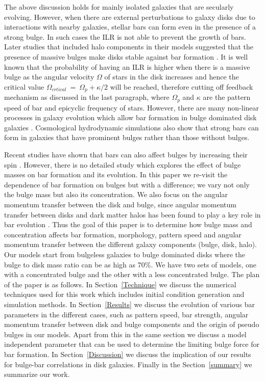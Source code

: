 \documentclass[a4paper,fleqn,usenatbib,useAMS]{mnras}
\begin{document}
The above discussion holds for mainly isolated galaxies that are secularly evolving. However, when there are external perturbations to galaxy disks due to interactions with nearby galaxies, stellar bars can form even in the presence of a strong bulge. In such cases the ILR is not able to prevent the growth of bars. Later studies that included halo components in their models suggested that the presence of massive bulges make disks stable against bar formation \citep{44a}. It is well known that the probability of having an ILR is higher when there is a massive bulge as the angular velocity $\Omega$ of stars in the disk increases and hence the critical value $\Omega_{crtical}~=~\Omega_{p} + \kappa/2 $ will be reached, therefore cutting off feedback mechanism as discussed in the last paragraph, where $\Omega_{p}$ and $\kappa$ are the pattern speed of bar and epicyclic frequency of stars. However, there are many non-linear processes in galaxy evolution which allow bar formation in bulge dominated disk galaxies \citep{49,50}. Cosmological hydrodynamic simulations \citep{48} also show that strong bars can form in galaxies that have prominent bulges rather than those without bulges. 


Recent studies have shown that bars can also affect bulges by increasing their spin \citep{51,52,53}. However, there is no detailed study which explores the effect of bulge masses on bar formation and its evolution. In this paper we re-visit the dependence of bar formation on bulges but with a difference; we vary not only the bulge mass but also its concentration.  We also focus on the angular momentum transfer between the disk and bulge, since angular momentum transfer between disks and dark matter halos has been found to play a key role in bar evolution \citep{18}. Thus the goal of this paper is to determine how bulge mass and concentration affects bar formation, morphology, pattern speed and angular momentum transfer between the different galaxy components (bulge, disk, halo). Our models start from bulgeless galaxies to bulge dominated disks where the bulge to disk mass ratio can be as high as 70\%. We have two sets of models, one with a concentrated bulge and the other with a less concentrated bulge. The plan of the paper is as follows. In Section~\ref{Technique} we discuss the numerical techniques used for this work which includes initial condition generation and simulation methods. In Section~\ref{Results} we discuss the evolution of various bar parameters in the different cases, such as pattern speed, bar strength, angular momentum transfer between disk and bulge components and the origin of pseudo bulges in our models. Apart from this in the same section we discuss a model independent parameter that can be used to determine the limiting bulge force for bar formation. In Section~\ref{Discussion} we discuss the implication of our results for bulge-bar correlations in disk galaxies. Finally in the Section~\ref{summary} we summarize our work. 
\end{document}
